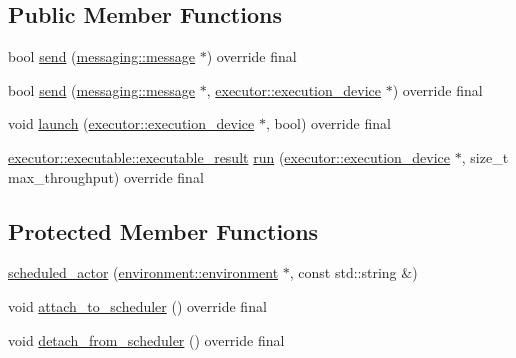 \subsection*{Public Member Functions}
\begin{DoxyCompactItemize}
\item 
bool \hyperlink{classactor__zeta_1_1actor_1_1scheduled__actor_acdd757f48a5233a9914209aaf7a2b5ed}{send} (\hyperlink{classactor__zeta_1_1messaging_1_1message}{messaging\+::message} $\ast$) override final
\item 
bool \hyperlink{classactor__zeta_1_1actor_1_1scheduled__actor_a223d20f327713fa65968f909aacb0a32}{send} (\hyperlink{classactor__zeta_1_1messaging_1_1message}{messaging\+::message} $\ast$, \hyperlink{structactor__zeta_1_1executor_1_1execution__device}{executor\+::execution\+\_\+device} $\ast$) override final
\item 
void \hyperlink{classactor__zeta_1_1actor_1_1scheduled__actor_a15dcbee3ab1540c7ed675846cbf10726}{launch} (\hyperlink{structactor__zeta_1_1executor_1_1execution__device}{executor\+::execution\+\_\+device} $\ast$, bool) override final
\item 
\hyperlink{structactor__zeta_1_1executor_1_1executable_aef06c63be7b22b021ade4b83ed4f3cc4}{executor\+::executable\+::executable\+\_\+result} \hyperlink{classactor__zeta_1_1actor_1_1scheduled__actor_a9031c2f3ff6c8c62698b53fa92e56274}{run} (\hyperlink{structactor__zeta_1_1executor_1_1execution__device}{executor\+::execution\+\_\+device} $\ast$, size\+\_\+t max\+\_\+throughput) override final
\end{DoxyCompactItemize}
\subsection*{Protected Member Functions}
\begin{DoxyCompactItemize}
\item 
\hyperlink{classactor__zeta_1_1actor_1_1scheduled__actor_a67ec95fe272be22dd146da79d067feaa}{scheduled\+\_\+actor} (\hyperlink{classactor__zeta_1_1environment_1_1environment}{environment\+::environment} $\ast$, const std\+::string \&)
\item 
void \hyperlink{classactor__zeta_1_1actor_1_1scheduled__actor_a760f7fedcd61cae392c435a13bcab50c}{attach\+\_\+to\+\_\+scheduler} () override final
\item 
void \hyperlink{classactor__zeta_1_1actor_1_1scheduled__actor_aaf6582fc27718071ff7c9d516b8f0cf6}{detach\+\_\+from\+\_\+scheduler} () override final
\end{DoxyCompactItemize}
